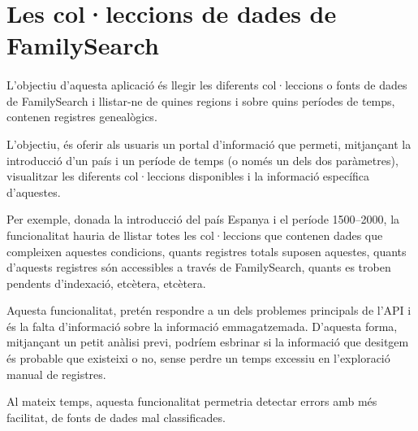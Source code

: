 \section{Les col·leccions de dades de FamilySearch}

    \paragraph{}
    L'objectiu d'aquesta aplicació és llegir les diferents col·leccions o fonts de dades de FamilySearch i llistar-ne de quines regions i sobre quins períodes de temps, contenen registres genealògics.

    L'objectiu, és oferir als usuaris un portal d'informació que permeti, mitjançant la introducció d'un país i un període de temps (o només un dels dos paràmetres), visualitzar les diferents col·leccions disponibles i la informació específica d'aquestes.

    Per exemple, donada la introducció del país Espanya i el període 1500--2000, la funcionalitat hauria de llistar totes les col·leccions que contenen dades que compleixen aquestes condicions, quants registres totals suposen aquestes, quants d'aquests regis\-tres són accessibles a través de FamilySearch, quants es troben pendents d'indexació, etcètera, etcètera.

    Aquesta funcionalitat, pretén respondre a un dels problemes principals de l'API i és la falta d'informació sobre la informació emmagatzemada. D'aquesta forma, mitjançant un petit anàlisi previ, podríem esbrinar si la informació que desitgem és probable que existeixi o no, sense perdre un temps excessiu en l'exploració manual de registres.

    Al mateix temps, aquesta funcionalitat permetria detectar errors amb més fa\-ci\-li\-tat, de fonts de dades mal classificades.
